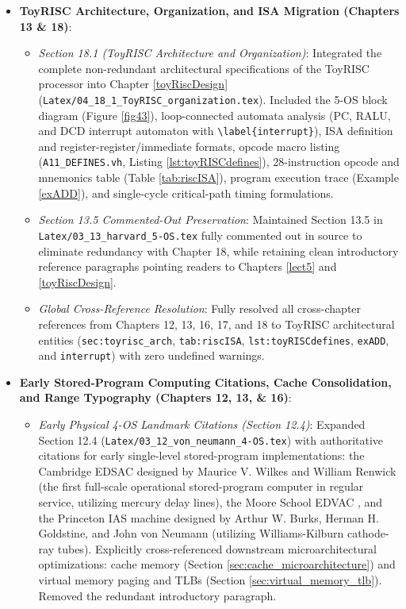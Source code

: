 \begin{itemize}
\begin{itemize}
    \end{itemize}
    \item \textbf{ToyRISC Architecture, Organization, and ISA Migration (Chapters 13 \& 18)}:
    \begin{itemize}
        \item \textit{Section 18.1 (ToyRISC Architecture and Organization)}: Integrated the complete non-redundant architectural specifications of the ToyRISC processor into Chapter \ref{toyRiscDesign} (\texttt{Latex/04\_18\_1\_ToyRISC\_organization.tex}). Included the 5-OS block diagram (Figure \ref{fig43}), loop-connected automata analysis (PC, RALU, and DCD interrupt automaton with \texttt{\textbackslash label\{interrupt\}}), ISA definition and register-register/immediate formats, opcode macro listing (\texttt{A11\_DEFINES.vh}, Listing \ref{lst:toyRISCdefines}), 28-instruction opcode and mnemonics table (Table \ref{tab:riscISA}), program execution trace (Example \ref{exADD}), and single-cycle critical-path timing formulations.
        \item \textit{Section 13.5 Commented-Out Preservation}: Maintained Section 13.5 in \texttt{Latex/03\_13\_harvard\_5-OS.tex} fully commented out in source to eliminate redundancy with Chapter 18, while retaining clean introductory reference paragraphs pointing readers to Chapters \ref{lect5} and \ref{toyRiscDesign}.
        \item \textit{Global Cross-Reference Resolution}: Fully resolved all cross-chapter references from Chapters 12, 13, 16, 17, and 18 to ToyRISC architectural entities (\texttt{sec:toyrisc\_arch}, \texttt{tab:riscISA}, \texttt{lst:toyRISCdefines}, \texttt{exADD}, and \texttt{interrupt}) with zero undefined warnings.
    \end{itemize}
    \item \textbf{Early Stored-Program Computing Citations, Cache Consolidation, and Range Typography (Chapters 12, 13, \& 16)}:
    \begin{itemize}
        \item \textit{Early Physical 4-OS Landmark Citations (Section 12.4)}: Expanded Section 12.4 (\texttt{Latex/03\_12\_von\_neumann\_4-OS.tex}) with authoritative citations for early single-level stored-program implementations: the Cambridge EDSAC designed by Maurice V. Wilkes and William Renwick \cite{wilkes1949edsac} (the first full-scale operational stored-program computer in regular service, utilizing mercury delay lines), the Moore School EDVAC \cite{vonNeumann1945, gluck1953edvac}, and the Princeton IAS machine designed by Arthur W. Burks, Herman H. Goldstine, and John von Neumann \cite{burks1946preliminary} (utilizing Williams-Kilburn cathode-ray tubes). Explicitly cross-referenced downstream microarchitectural optimizations: cache memory (Section \ref{sec:cache_microarchitecture}) and virtual memory paging and TLBs (Section \ref{sec:virtual_memory_tlb}). Removed the redundant introductory paragraph.

\end{itemize}
\end{itemize}
